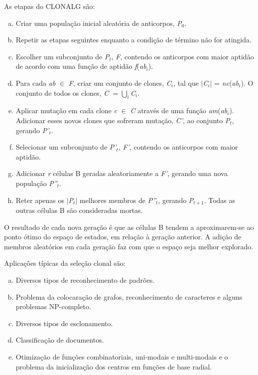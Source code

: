 As etapas do CLONALG são:

\begin{enumerate}[a)]
    \item Criar uma população inicial aleatória de anticorpos, \emph{P$_{0}$}.
    \item Repetir as etapas seguintes enquanto a condição de término não for atingida.
    \item Escolher um subconjunto de \emph{P$_{t}$}, \emph{F}, contendo os anticorpos com maior aptidão de acordo com uma função de aptidão \emph{f}(\emph{ab{$_{i}$}}).
    \item Para cada \emph{ab} $\in$ \emph{F}, criar um conjunto de clones, \emph{C$_{i}$}, tal que $|$\emph{C$_{i}$}$|$ = \emph{nc}(\emph{ab$_{i}$}). O conjunto de todos os clones, \emph{C} $= \bigcup_{i}$\emph{C$_{i}$}.
    \item Aplicar mutação em cada clone \emph{c} $\in$ \emph{C} através de uma função \emph{am}(\emph{ab$_{i}$}). Adicionar esses novos clones que sofreram mutação, \emph{C'}, ao conjunto \emph{P$_{t}$}, gerando \emph{P'$_{t}$}.
    \item Selecionar um subconjunto de \emph{P'$_{t}$}, \emph{F'}, contendo os anticorpos com maior aptidão.
    \item Adicionar \emph{r} células B geradas aleatoriamente a \emph{F'}, gerando uma nova população \emph{P''$_{t}$}.
    \item Reter apenas os $|$\emph{P$_{t}$}$|$ melhores membros de \emph{P''$_{t}$}, gerando \emph{P$_{t+1}$}. Todas as outras células B são consideradas mortas.
\end{enumerate}

O resultado de cada nova geração é que as células B tendem a aproximarem-se ao ponto ótimo do espaço de estados, em relação à geração anterior. A adição de membros aleatórios em cada geração faz com que o espaço seja melhor explorado.

Aplicações típicas da seleção clonal são:

\begin{enumerate}[a)]
    \item Diversos tipos de reconhecimento de padrões.
    \item Problema da colocaração de grafos, reconhecimento de caracteres e alguns problemas NP-completo.
    \item Diversos tipos de esclonamento.
    \item Classificação de documentos.
    \item Otimização de funções combinatoriais, uni-modais e multi-modais e o problema da inicialização dos centros em funções de base radial.
\end{enumerate}

